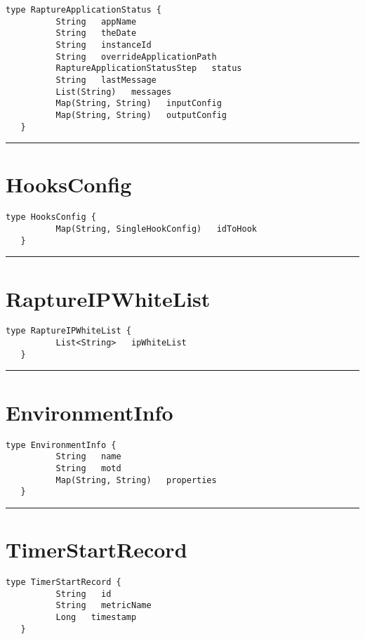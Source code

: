 \begin{lstlisting}[style=nonumbers]
   type RaptureApplicationStatus {
          String   appName
          String   theDate
          String   instanceId
          String   overrideApplicationPath
          RaptureApplicationStatusStep   status
          String   lastMessage
          List(String)   messages
          Map(String, String)   inputConfig
          Map(String, String)   outputConfig
   }
\end{lstlisting}

\rule{12cm}{2pt}
\section{HooksConfig}
\label{type:HooksConfig}

\begin{lstlisting}[style=nonumbers]
   type HooksConfig {
          Map(String, SingleHookConfig)   idToHook
   }
\end{lstlisting}

\rule{12cm}{2pt}
\section{RaptureIPWhiteList}
\label{type:RaptureIPWhiteList}

\begin{lstlisting}[style=nonumbers]
   type RaptureIPWhiteList {
          List<String>   ipWhiteList
   }
\end{lstlisting}

\rule{12cm}{2pt}
\section{EnvironmentInfo}
\label{type:EnvironmentInfo}

\begin{lstlisting}[style=nonumbers]
   type EnvironmentInfo {
          String   name
          String   motd
          Map(String, String)   properties
   }
\end{lstlisting}

\rule{12cm}{2pt}
\section{TimerStartRecord}
\label{type:TimerStartRecord}

\begin{lstlisting}[style=nonumbers]
   type TimerStartRecord {
          String   id
          String   metricName
          Long   timestamp
   }
\end{lstlisting}


